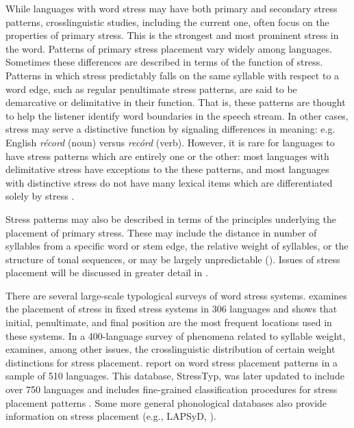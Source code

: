   While languages with word stress may have both primary and secondary stress patterns, crosslinguistic studies, including the current one, often focus on the properties of primary stress. This is the strongest and most prominent stress in the word. Patterns of primary stress placement vary widely among languages. Sometimes these differences are described in terms of the function of stress. Patterns in which stress predictably falls on the same syllable with respect to a word edge, such as regular penultimate stress patterns, are said to be demarcative or delimitative in their function. That is, these patterns are thought to help the listener identify word boundaries in the speech stream. In other cases, stress may serve a distinctive function by signaling differences in meaning: e.g. English \textit{récord} (noun) versus \textit{recórd} (verb). However, it is rare for languages to have stress patterns which are entirely one or the other: most languages with delimitative stress have exceptions to the these patterns, and most languages with distinctive stress do not have many lexical items which are differentiated solely by stress \citep[14-15]{Cruttenden1997}. 

  Stress patterns may also be described in terms of the principles underlying the placement of primary stress. These may include the distance in number of syllables from a specific word or stem edge, the relative weight of syllables, or the structure of tonal sequences, or may be largely unpredictable (\citealt{vanderHulst2010}). Issues of stress placement will be discussed in greater detail in .

  There are several large-scale typological surveys of word stress systems. \citet{Hyman1977} examines the placement of stress in fixed stress systems in 306 languages and shows that initial, penultimate, and final position are the most frequent locations used in these systems. In a 400-language survey of phenomena related to syllable weight, \citet{Gordon2006} examines, among other issues, the crosslinguistic distribution of certain weight distinctions for stress placement. \citet{GoedemansvanderHulst2013a,GoedemansvanderHulst2013b} report on word stress placement patterns in a sample of 510 languages. This database, StressTyp, was later updated to include over 750 languages and includes fine-grained classification procedures for stress placement patterns \citep{GoedemansEtAl2017}. Some more general phonological databases also provide information on stress placement (e.g., LAPSyD, \citealt{MaddiesonEtAl2013}).

